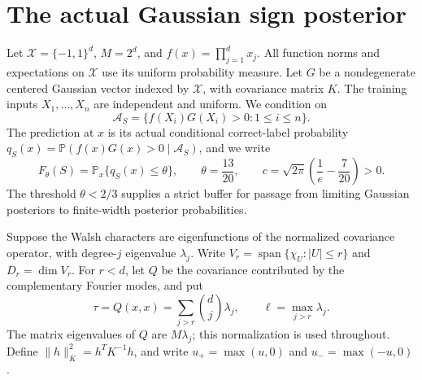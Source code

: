 
\section{The actual Gaussian sign posterior}
Let $\mathcal X=\{-1,1\}^d$, $M=2^d$, and
$f(x)=\prod_{j=1}^d x_j$. All function norms and expectations on
$\mathcal X$ use its uniform probability measure. Let $G$ be a
nondegenerate centered Gaussian vector indexed by $\mathcal X$, with
covariance matrix $K$. The training inputs $X_1,\ldots,X_n$ are independent
and uniform. We condition on
\[
 \mathcal A_S=\{f(X_i)G(X_i)>0:1\le i\le n\}.
\]
The prediction at $x$ is its actual conditional correct-label probability
$q_S(x)=\mathbb P(f(x)G(x)>0\mid\mathcal A_S)$, and we write
\[
 F_\theta(S)=\mathbb P_x\{q_S(x)\le\theta\},\qquad
 \theta=\frac{13}{20},\qquad
 c=\sqrt{2\pi}\left(\frac1e-\frac7{20}\right)>0.
\]
The threshold $\theta<2/3$ supplies a strict buffer for passage from
limiting Gaussian posteriors to finite-width posterior probabilities.

Suppose the Walsh characters are eigenfunctions of the normalized
covariance operator, with degree-$j$ eigenvalue $\lambda_j$. Write
$V_r=\operatorname{span}\{\chi_U:|U|\le r\}$ and $D_r=\dim V_r$.
For $r<d$, let $Q$ be the covariance contributed by the complementary
Fourier modes, and put
\[
 \tau=Q(x,x)=\sum_{j>r}\binom dj\lambda_j,
 \qquad \ell=\max_{j>r}\lambda_j.
\]
The matrix eigenvalues of $Q$ are $M\lambda_j$; this normalization is
used throughout. Define $\|h\|_K^2=h^TK^{-1}h$, and write $u_+=\max(u,0)$ and $u_-=\max(-u,0)$.

